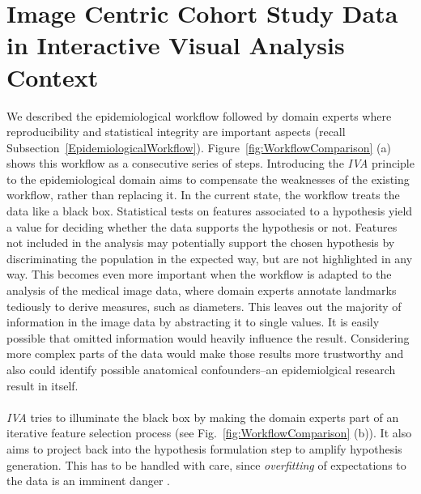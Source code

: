 \documentclass[journal]{style/vgtc} 			          %
\begin{document}
\section{Image Centric Cohort Study Data in Interactive Visual Analysis Context} \label{Image Centric Cohort Study Data in Interactive Visual Analysis Context}
We described the epidemiological workflow followed by domain experts where reproducibility and statistical integrity are important aspects (recall Subsection~\ref{EpidemiologicalWorkflow}).
%
Figure~\ref{fig:WorkflowComparison} (a) shows this workflow as a consecutive series of steps.
%
Introducing the \emph{IVA} principle to the epidemiological domain aims to compensate the weaknesses of the existing workflow, rather than replacing it.
%
In the current state, the workflow treats the data like a black box.
%
Statistical tests on features associated to a hypothesis yield a value for deciding whether the data supports the hypothesis or not.
%
Features not included in the analysis may potentially support the chosen hypothesis by discriminating the population in the expected way, but are not highlighted in any way.
%
This becomes even more important when the workflow is adapted to the analysis of the medical image data, where
domain experts annotate landmarks tediously to derive measures, such as diameters.
%
This leaves out the majority of information in the image data by abstracting it to single values.
%
It is easily possible that omitted information would heavily influence the result.
%
Considering more complex parts of the data would make those results more trustworthy and also could identify possible anatomical confounders--an epidemiolgical research result in itself.
\\\\
\emph{IVA} tries to illuminate the black box by making the domain experts part of an iterative feature selection process (see Fig.~\ref{fig:WorkflowComparison} (b)).
%
It also aims to project back into the hypothesis formulation step to amplify hypothesis generation.
%
This has to be handled with care, since \emph{overfitting} of expectations to the data is an imminent danger \cite{Turkay2013}.
\end{document}
